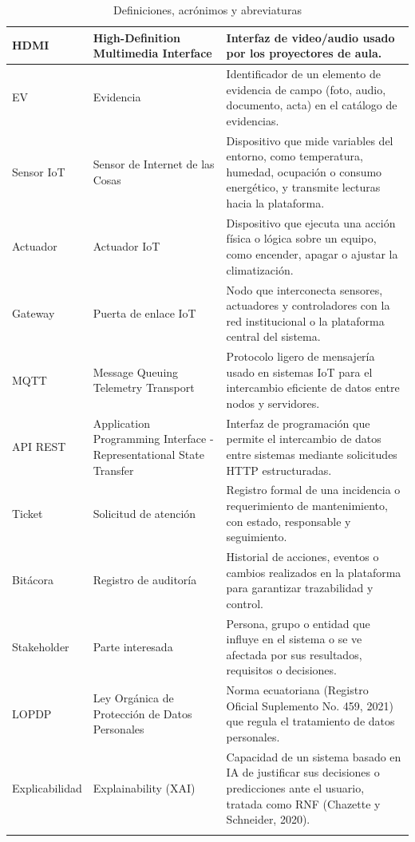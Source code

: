 \begin{longtable}{|p{5.2cm}|p{5.2cm}|p{5.2cm}|}
HDMI & High-Definition Multimedia Interface & Interfaz de video/audio usado por los proyectores de aula. \\ \hline
EV & Evidencia & Identificador de un elemento de evidencia de campo (foto, audio, documento, acta) en el catálogo de evidencias. \\ \hline
Sensor IoT & Sensor de Internet de las Cosas & Dispositivo que mide variables del entorno, como temperatura, humedad, ocupación o consumo energético, y transmite lecturas hacia la plataforma. \\ \hline
Actuador & Actuador IoT & Dispositivo que ejecuta una acción física o lógica sobre un equipo, como encender, apagar o ajustar la climatización. \\ \hline
Gateway & Puerta de enlace IoT & Nodo que interconecta sensores, actuadores y controladores con la red institucional o la plataforma central del sistema. \\ \hline
MQTT & Message Queuing Telemetry Transport & Protocolo ligero de mensajería usado en sistemas IoT para el intercambio eficiente de datos entre nodos y servidores. \\ \hline
API REST & Application Programming Interface - Representational State Transfer & Interfaz de programación que permite el intercambio de datos entre sistemas mediante solicitudes HTTP estructuradas. \\ \hline
Ticket & Solicitud de atención & Registro formal de una incidencia o requerimiento de mantenimiento, con estado, responsable y seguimiento. \\ \hline
Bitácora & Registro de auditoría & Historial de acciones, eventos o cambios realizados en la plataforma para garantizar trazabilidad y control. \\ \hline
Stakeholder & Parte interesada & Persona, grupo o entidad que influye en el sistema o se ve afectada por sus resultados, requisitos o decisiones. \\ \hline
LOPDP & Ley Orgánica de Protección de Datos Personales & Norma ecuatoriana (Registro Oficial Suplemento No. 459, 2021) que regula el tratamiento de datos personales. \\ \hline
Explicabilidad & Explainability (XAI) & Capacidad de un sistema basado en IA de justificar sus decisiones o predicciones ante el usuario, tratada como RNF (Chazette y Schneider, 2020). \\ \hline
\caption{Definiciones, acrónimos y abreviaturas}
\end{longtable}
\endgroup

